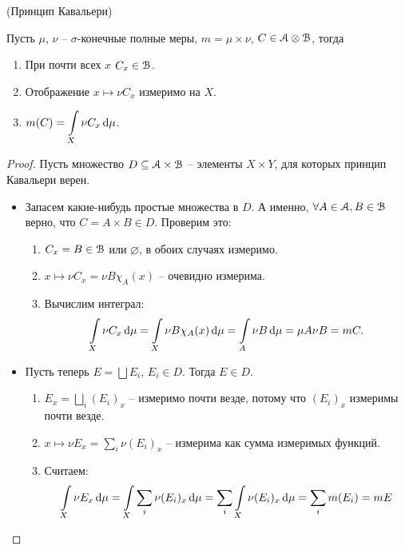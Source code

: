 \begin{theorem}(Принцип Кавальери)
    
    Пусть $\mu$, $\nu$ -- $\sigma$-конечные полные меры, $m = \mu \times \nu$, $C \in \mathcal{A} \otimes \mathcal{B}$,
    тогда
    \begin{enumerate}
        \item При почти всех $x$ $C_x \in \mathcal{B}$.
        \item Отображение $x \mapsto \nu{C_x}$ измеримо на $X$.
        \item $\displaystyle m(C) = \int\limits_{X}{\nu{C_x} \,\mathrm{d}\mu}$.
    \end{enumerate} 
\end{theorem}
\begin{proof}
    Пусть множество $D \subseteq \mathcal{A} \times \mathcal{B}$ -- элементы $X \times Y$, для которых 
    принцип Кавальери верен.
    \begin{itemize}
        \item Запасем какие-нибудь простые множества в $D$. А именно, $\forall A \in \mathcal{A}, B \in \mathcal{B}$
            верно, что $C = A \times B \in D$. Проверим это:
            \begin{enumerate}
                \item $C_x = B \in \mathcal{B}$ или $\varnothing$, в обоих случаях измеримо.
                \item $x \mapsto \nu{C_x} = \nu{B} \chi_A(x)$ -- очевидно измерима.
                \item Вычислим интеграл:
\[
    \int\limits_X{\nu{C_x} \,\mathrm{d}\mu} = \int\limits_X{\nu{B} \chi_A(x) \,\mathrm{d}\mu} = 
    \int\limits_A{\nu{B} \,\mathrm{d}\mu} = \mu{A} \nu{B} = m{C}
.\]
            \end{enumerate}
        \item Пусть теперь $E = \bigsqcup{E_i}$, $E_i \in D$. Тогда $E \in D$.
            \begin{enumerate}
                \item $E_x = \bigsqcup_i{(E_i)_x}$ -- измеримо почти везде, потому что
                    $(E_i)_x$ измеримы почти везде.
                \item $x \mapsto \nu{E_x} = \sum_i{\nu{(E_i)_x}}$ -- измерима как сумма
                    измеримых функций.
                \item Считаем:
\[
    \int\limits_X{\nu{E_x} \,\mathrm{d}\mu} = \int\limits_X{\sum_i{\nu{(E_i)_x}} \,\mathrm{d}\mu} =
    \sum_i{\int\limits_X{\nu{(E_i)_x} \,\mathrm{d}\mu}} = \sum_i{m(E_i)} = m{E}
\]
\end{enumerate}
\end{itemize}
\end{proof}
